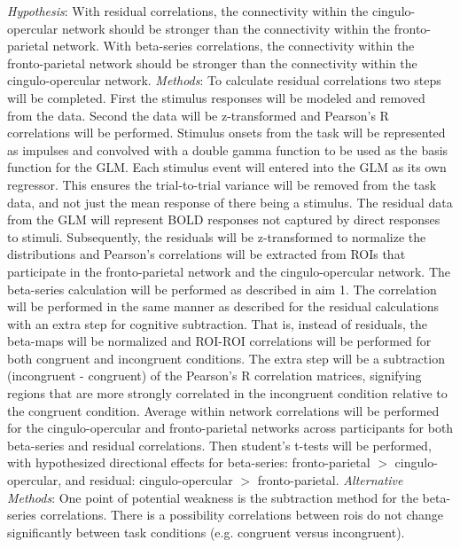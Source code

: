 \documentclass[phd,appendix,figures]{uithesis}
\begin{document}
\newline
\textit{Hypothesis}:
With residual correlations, the connectivity within the cingulo-opercular network should be stronger than the connectivity within the fronto-parietal network. With beta-series correlations, the connectivity within the fronto-parietal network should be stronger than the connectivity within the cingulo-opercular network.
\newline
\textit{Methods}: To calculate residual correlations two steps will be completed.
First the stimulus responses will be modeled and removed from the data.
Second the data will be z-transformed and Pearson's R correlations will be performed.
Stimulus onsets from the task will be represented as impulses and convolved with a double gamma function to be used as the basis function for the GLM. 
Each stimulus event will entered into the GLM as its own regressor.
This ensures the trial-to-trial variance will be removed from the task data, and not just the mean response of there being a stimulus. 
The residual data from the GLM will represent BOLD responses not captured by direct responses to stimuli. 
Subsequently, the residuals will be z-transformed to normalize the distributions and Pearson's correlations will be extracted from ROIs that participate in the fronto-parietal network and the cingulo-opercular network.
The beta-series calculation will be performed as described in aim 1. 
The correlation will be performed in the same manner as described for the residual calculations with an extra step for cognitive subtraction.
That is, instead of residuals, the beta-maps will be normalized and ROI-ROI correlations will be performed for both congruent and incongruent conditions.
The extra step will be a subtraction (incongruent - congruent) of the Pearson's R correlation matrices, signifying regions that are more strongly correlated in the incongruent condition relative to the congruent condition.
Average within network correlations will be performed for the cingulo-opercular and fronto-parietal networks across participants for both beta-series and residual correlations.
Then student's t-tests will be performed, with hypothesized directional effects for beta-series: fronto-parietal $>$ cingulo-opercular, and residual: cingulo-opercular $>$ fronto-parietal.
\newline
\textit{Alternative Methods}: 
One point of potential weakness is the subtraction method for the beta-series correlations.
There is a possibility correlations between rois do not change significantly between task conditions (e.g. congruent versus incongruent). 
\end{document}
